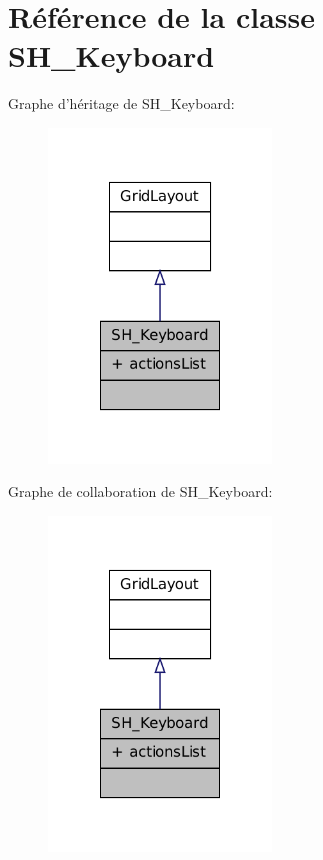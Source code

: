 \hypertarget{classSH__Keyboard}{\section{Référence de la classe S\-H\-\_\-\-Keyboard}
\label{classSH__Keyboard}
}


Graphe d'héritage de S\-H\-\_\-\-Keyboard\-:
\nopagebreak
\begin{figure}[H]
\begin{center}
\leavevmode
\includegraphics[width=168pt]{classSH__Keyboard__inherit__graph}
\end{center}
\end{figure}


Graphe de collaboration de S\-H\-\_\-\-Keyboard\-:
\nopagebreak
\begin{figure}[H]
\begin{center}
\leavevmode
\includegraphics[width=168pt]{classSH__Keyboard__coll__graph}
\end{center}
\end{figure}

